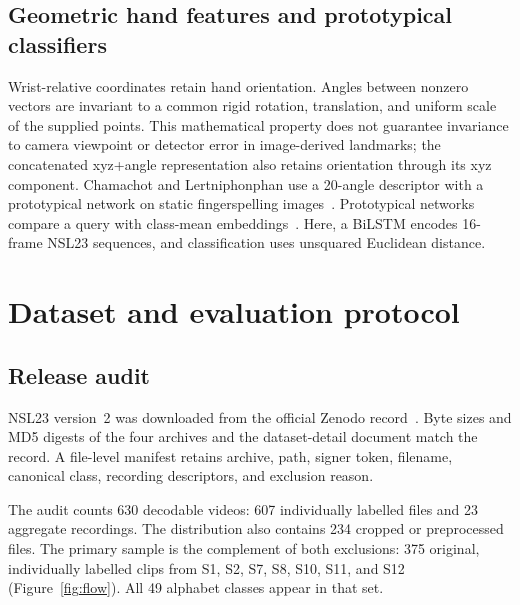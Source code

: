 \documentclass[11pt,a4paper]{article}
\begin{document}
\subsection{Geometric hand features and prototypical classifiers}

Wrist-relative coordinates retain hand orientation. Angles between nonzero vectors are invariant to a common rigid rotation, translation, and uniform scale of the supplied points. This mathematical property does not guarantee invariance to camera viewpoint or detector error in image-derived landmarks; the concatenated xyz+angle representation also retains orientation through its xyz component. Chamachot and Lertniphonphan use a 20-angle descriptor with a prototypical network on static fingerspelling images~\cite{chamachot2026geometry}. Prototypical networks compare a query with class-mean embeddings~\cite{snell2017prototypical}. Here, a BiLSTM encodes 16-frame NSL23 sequences, and classification uses unsquared Euclidean distance.

\section{Dataset and evaluation protocol}

\subsection{Release audit}

NSL23 version~2 was downloaded from the official Zenodo record~\cite{sunuwar2023zenodo}. Byte sizes and MD5 digests of the four archives and the dataset-detail document match the record. A file-level manifest retains archive, path, signer token, filename, canonical class, recording descriptors, and exclusion reason.

The audit counts 630 decodable videos: 607 individually labelled files and 23 aggregate recordings. The distribution also contains 234 cropped or preprocessed files. The primary sample is the complement of both exclusions: 375 original, individually labelled clips from S1, S2, S7, S8, S10, S11, and S12 (Figure~\ref{fig:flow}). All 49 alphabet classes appear in that set.
\end{document}

